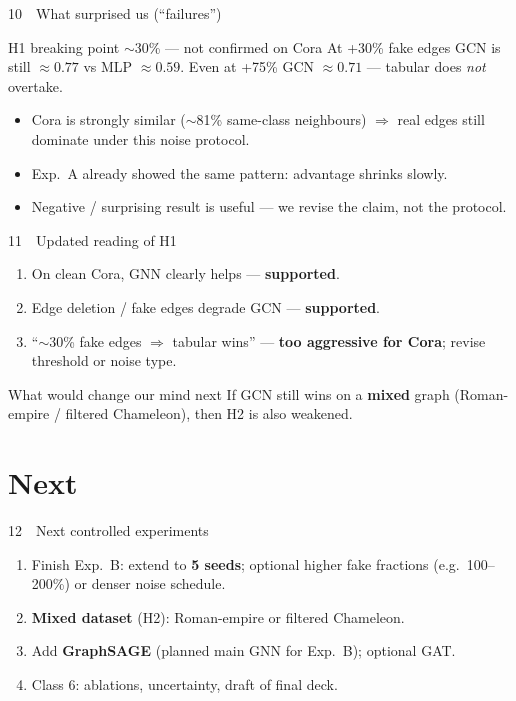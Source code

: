 \documentclass[
  english,
  aspectratio=169,
]{beamer}
\begin{document}
\begin{frame}{10~~What surprised us (``failures'')}
  \begin{alertblock}{H1 breaking point $\sim$30\% --- not confirmed on Cora}
    At +30\% fake edges GCN is still $\approx 0.77$ vs MLP $\approx 0.59$.
    Even at +75\% GCN $\approx 0.71$ --- tabular does \emph{not} overtake.
  \end{alertblock}

  \begin{itemize}
    \item Cora is strongly similar ($\sim$81\% same-class neighbours)
      $\Rightarrow$ real edges still dominate under this noise protocol.
    \item Exp.\ A already showed the same pattern: advantage shrinks slowly.
    \item Negative / surprising result is useful --- we revise the claim,
      not the protocol.
  \end{itemize}
\end{frame}

\begin{frame}{11~~Updated reading of H1}
  \begin{enumerate}
    \item On clean Cora, GNN clearly helps --- \textbf{supported}.
    \item Edge deletion / fake edges degrade GCN --- \textbf{supported}.
    \item ``$\sim$30\% fake edges $\Rightarrow$ tabular wins'' ---
      \textbf{too aggressive for Cora}; revise threshold or noise type.
  \end{enumerate}

  \vspace{0.5em}
  \begin{block}{What would change our mind next}
    If GCN still wins on a \textbf{mixed} graph (Roman-empire / filtered
    Chameleon), then H2 is also weakened.
  \end{block}
\end{frame}

\section{Next}

\begin{frame}{12~~Next controlled experiments}
  \begin{enumerate}
    \item Finish Exp.\ B: extend to \textbf{5 seeds}; optional higher fake
      fractions (e.g.\ 100--200\%) or denser noise schedule.
    \item \textbf{Mixed dataset} (H2): Roman-empire or filtered Chameleon.
    \item Add \textbf{GraphSAGE} (planned main GNN for Exp.\ B); optional GAT.
    \item Class 6: ablations, uncertainty, draft of final deck.
  \end{enumerate}
\end{frame}
\end{document}
